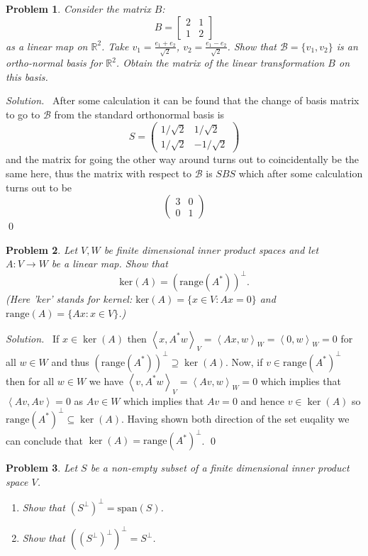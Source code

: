 \documentclass[12pt,a4paper]{article}
\newenvironment{solution}{%
  \par\noindent\textit{Solution.}\ }{\qed}
\theoremstyle{problemstyle}
\newtheorem{problem}{Problem}[section]
\newcommand{\ipp}[1]{{\left\langle{#1}\right\rangle}}
\begin{document}
\begin{problem}\label{prob:2-7}
Consider the matrix $B$:
$$B=\begin{bmatrix}2&1\\ 1&2\end{bmatrix}$$
as a linear map on $\mathbb{R}^{2}$. Take $v_{1}=\frac{e_{1}+e_{2}}{\sqrt{2}}$, $v_{2}=\frac{e_{1}-e_{2}}{\sqrt{2}}$. Show that $\mathcal{B}=\{v_{1},v_{2}\}$ is an ortho-normal basis for $\mathbb{R}^{2}$. Obtain the matrix of the linear transformation $B$ on this basis.
\end{problem}
\begin{solution}
After some calculation it can be found that the change of basis matrix to go to $\mathcal B$ from the standard orthonormal basis is 
$$S=\begin{pmatrix}1/\sqrt{2} & 1/\sqrt{2}\\ 1/\sqrt{2} & -1/\sqrt{2}\end{pmatrix}$$
and the matrix for going the other way around turns out to coincidentally be the same here, thus the matrix with respect to $\mathcal B$ is $SBS$ which after some calculation turns out to be
$$\begin{pmatrix}3 & 0\\ 0 & 1\end{pmatrix}$$
\end{solution}
\begin{problem}\label{prob:2-8}
Let $V, W$ be finite dimensional inner product spaces and let $A:V\rightarrow W$ be a linear map. Show that
$$\text{ker}(A)=(\text{range}(A^{*}))^{\perp}.$$
(Here 'ker' stands for kernel: $\text{ker}(A)=\{x\in V:Ax=0\}$ and $\text{range}(A)=\{Ax:x\in V\}$.)
\end{problem}
\begin{solution}
	If $x\in\ker(A)$ then $\ipp{x,A^*w}_V=\ipp{Ax,w}_W=\ipp{0,w}_W=0$ for all $w\in W$ and thus $(\text{range}(A^*))^\perp\supseteq\ker(A)$. Now, if $v\in\text{range}(A^*)^\perp$ then for all $w\in W$ we have $\ipp{v,A^*w}_V=\ipp{Av,w}_W=0$ which implies that $\ipp{Av,Av}=0$ as $Av\in W$ which implies that $Av=0$ and hence $v\in\ker(A)$ so $\text{range}(A^*)^\perp\subseteq\ker(A)$. Having shown both direction of the set euqality we can conclude that $\ker(A)=\text{range}(A^*)^\perp$. 
\end{solution}
\begin{problem}\label{prob:2-9}
Let $S$ be a non-empty subset of a finite dimensional inner product space $V$.
\begin{enumerate}
    \item[(i)] Show that $(S^{\perp})^{\perp}= \text{span}(S)$.
    \item[(ii)] Show that $((S^{\perp})^{\perp})^{\perp}=S^{\perp}$.
\end{enumerate}
\end{problem}
\end{document}
